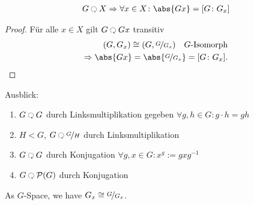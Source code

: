 \begin{theorem}
	
	\begin{align*}
		G \Circlearrowleft X \implies \forall x \in X\colon \abs{Gx} = [G \colon G_x]
	\end{align*}
\end{theorem}
\begin{proof}
	Für alle $x \in X$ gilt $G \Circlearrowleft G x$ transitiv
	\begin{align*}
		(G,G_x) \cong (G,\lnkset{G}{G_x}) \quad G\text{-Isomorph}\\
		\implies \abs{Gx} = \abs{\lnkset{G}{G_x}} = [G \colon G_x].
	\end{align*}
\end{proof}
Ausblick:\\
\begin{enumerate}
	\item $G \Circlearrowleft G$ durch Linksmultiplikation gegeben $\forall g,h \in G\colon g\cdot h = gh$
	\item $H< G$, $G \Circlearrowleft \lnkset{G}{H}$ durch Linksmultiplikation
	\item $G \Circlearrowleft G$ durch Konjugation $\forall g,x \in G \colon x^g := gxg^{-1}$
	\item $G \Circlearrowleft \powerset(G)$ durch Konjugation
\end{enumerate}
\begin{theorem}
	As $G$-Space, we have $G_x \cong \lnkset{G}{G_x}$.
\end{theorem}
